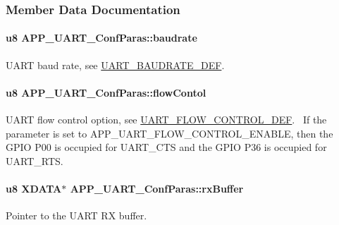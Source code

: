\subsubsection{Member Data Documentation}
\paragraph[{\texorpdfstring{baudrate}{baudrate}}]{\setlength{\rightskip}{0pt plus 5cm}u8 A\+P\+P\+\_\+\+U\+A\+R\+T\+\_\+\+Conf\+Paras\+::baudrate}\hypertarget{struct_a_p_p___u_a_r_t___conf_paras_a44c82eefdb9983db1acd6ca61e7ae2da}{}\label{struct_a_p_p___u_a_r_t___conf_paras_a44c82eefdb9983db1acd6ca61e7ae2da}
U\+A\+RT baud rate, see \hyperlink{group___u_a_r_t___b_a_u_d_r_a_t_e___d_e_f}{U\+A\+R\+T\+\_\+\+B\+A\+U\+D\+R\+A\+T\+E\+\_\+\+D\+EF}. 
\paragraph[{\texorpdfstring{flow\+Contol}{flowContol}}]{\setlength{\rightskip}{0pt plus 5cm}u8 A\+P\+P\+\_\+\+U\+A\+R\+T\+\_\+\+Conf\+Paras\+::flow\+Contol}\hypertarget{struct_a_p_p___u_a_r_t___conf_paras_a874c375f80b2329e3a1cb485d94b9cb3}{}\label{struct_a_p_p___u_a_r_t___conf_paras_a874c375f80b2329e3a1cb485d94b9cb3}
U\+A\+RT flow control option, see \hyperlink{group___u_a_r_t___f_l_o_w___c_o_n_t_r_o_l___d_e_f}{U\+A\+R\+T\+\_\+\+F\+L\+O\+W\+\_\+\+C\+O\+N\+T\+R\+O\+L\+\_\+\+D\+EF}.~\newline
 If the parameter is set to A\+P\+P\+\_\+\+U\+A\+R\+T\+\_\+\+F\+L\+O\+W\+\_\+\+C\+O\+N\+T\+R\+O\+L\+\_\+\+E\+N\+A\+B\+LE, then the G\+P\+IO P00 is occupied for U\+A\+R\+T\+\_\+\+C\+TS and the G\+P\+IO P36 is occupied for U\+A\+R\+T\+\_\+\+R\+TS. 
\paragraph[{\texorpdfstring{rx\+Buffer}{rxBuffer}}]{\setlength{\rightskip}{0pt plus 5cm}u8 X\+D\+A\+TA$\ast$ A\+P\+P\+\_\+\+U\+A\+R\+T\+\_\+\+Conf\+Paras\+::rx\+Buffer}\hypertarget{struct_a_p_p___u_a_r_t___conf_paras_a7647cd1d40dbdbde863d7a3efa6321e8}{}\label{struct_a_p_p___u_a_r_t___conf_paras_a7647cd1d40dbdbde863d7a3efa6321e8}
Pointer to the U\+A\+RT RX buffer. 

